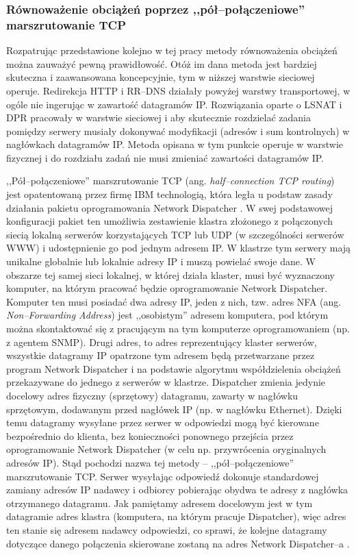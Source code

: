 \subsubsection{Równoważenie obciążeń poprzez ,,pół--połączeniowe'' marszrutowanie TCP}

Rozpatrując przedstawione kolejno w tej pracy metody równoważenia obciążeń można zauważyć pewną 
prawidłowość. Otóż im dana metoda jest bardziej skuteczna i zaawansowana koncepcyjnie, tym w niższej warstwie 
sieciowej operuje. Redirekcja HTTP i RR--DNS działały powyżej warstwy transportowej, w ogóle nie ingerując w 
zawartość datagramów IP. Rozwiązania oparte o LSNAT i DPR pracowały w warstwie sieciowej i aby skutecznie 
rozdzielać zadania pomiędzy serwery musiały dokonywać modyfikacji (adresów i sum kontrolnych) w nagłówkach  
datagramów IP. Metoda opisana w tym punkcie operuje w warstwie fizycznej  i do rozdziału zadań nie musi 
zmieniać zawartości datagramów IP.

,,Pół--połączeniowe'' marszrutowanie TCP (ang. \emph{half--connection TCP routing}) jest opatentowaną przez 
firmę IBM technologią, która legła u podstaw zasady działania pakietu oprogramowania Network Dispatcher \cite{barylo35,barylo36}. 
W swej podstawowej konfiguracji pakiet ten umożliwia zestawienie klastra złożonego z połączonych 
siecią lokalną serwerów korzystających TCP lub UDP (w szczególności serwerów WWW) i udostępnienie go pod 
jednym adresem IP. W klastrze tym serwery mają unikalne globalnie lub lokalnie adresy IP i  muszą powielać 
swoje dane. W obszarze tej samej sieci lokalnej, w której działa klaster, musi być wyznaczony komputer, na 
którym pracować będzie oprogramowanie Network Dispatcher. Komputer ten musi posiadać dwa adresy IP, jeden z 
nich, tzw. adres NFA (ang. \emph{Non--Forwarding Address}) jest ,,osobistym'' adresem komputera, pod którym można 
skontaktować się z pracującym na tym komputerze oprogramowaniem (np. z agentem SNMP). Drugi adres, to adres 
reprezentujący klaster serwerów, wszystkie datagramy IP opatrzone tym adresem będą przetwarzane przez program 
Network Dispatcher i na podstawie algorytmu współdzielenia obciążeń przekazywane do jednego z serwerów w 
klastrze. Dispatcher zmienia jedynie docelowy adres fizyczny (sprzętowy) datagramu, zawarty w nagłówku 
sprzętowym, dodawanym przed nagłówek IP (np. w nagłówku Ethernet). Dzięki temu datagramy wysyłane przez serwer 
w odpowiedzi mogą być kierowane bezpośrednio do klienta, bez konieczności ponownego przejścia przez 
oprogramowanie Network Dispatcher (w celu np. przywrócenia oryginalnych adresów IP). Stąd pochodzi nazwa tej 
metody -- ,,pół--połączeniowe'' marszrutowanie TCP. Serwer wysyłając odpowiedź dokonuje standardowej zamiany adresów 
IP nadawcy i odbiorcy pobierając obydwa te adresy z nagłówka otrzymanego datagramu. Jak pamiętamy adresem 
docelowym jest w tym datagramie adres klastra (komputera, na którym pracuje Dispatcher), więc adres ten stanie 
się adresem nadawcy odpowiedzi, co sprawi, że kolejne datagramy dotyczące danego połączenia skierowane zostaną 
na adres Network Dispatcher--a \cite{barylo36}.

